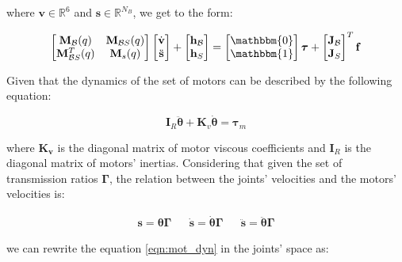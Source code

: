 where $\mathrm{\mathbf{v}} \in \mathbb{R} ^{6}$ and $\mathbf{s} \in \mathbb{R}^{N_B}$, we get to the form:

\begin{equation}
    \begin{bmatrix}
        \mathbf{M} _{\mathcal{B}}(q)     & \mathbf{M} _{\mathcal{B}S}(q) \\
        \mathbf{M} _{\mathcal{B}S} ^T(q) & \mathbf{M} _s(q)
    \end{bmatrix}
    \begin{bmatrix}
        \dot{\mathrm{\mathbf{v}}} \\
        \ddot{\mathbf{s}}
    \end{bmatrix}+
    \begin{bmatrix}
        \mathbf{h} _{\mathcal{B}} \\
        \mathbf{h} _S
    \end{bmatrix}=
    \begin{bmatrix}
        \mathbbm{0} \\
        \mathbbm{1}
    \end{bmatrix}
    \boldsymbol{\tau}
    +
    \begin{bmatrix}
        \mathbf{J} _{\mathcal{B}} \\
        \mathbf{J} _S
    \end{bmatrix} ^T
    \mathbf{f}
\end{equation}

Given that the dynamics of the set of motors can be described by the following equation:

\begin{equation}
    \mathbf{I} _R \ddot{\boldsymbol{\theta}} + \mathbf{K}_v \dot{\boldsymbol{\theta}} = \boldsymbol{\tau}_m
    \label{eqn:mot_dyn}
\end{equation}

where $\mathbf{K _v}$ is the diagonal matrix of motor viscous coefficients and $\mathbf{I}_R$ is the diagonal matrix of motors' inertias. Considering that given the set of transmission ratios $\boldsymbol{\Gamma}$, the relation between the joints' velocities and the motors' velocities is:

\begin{align}
    \mathbf{s} = \boldsymbol{\theta} \boldsymbol{\Gamma} &  & \dot{\mathbf{s}} = \dot{\boldsymbol{\theta}} \boldsymbol{\Gamma} &  & \ddot{\mathbf{s}} = \ddot{\boldsymbol{\theta}} \boldsymbol{\Gamma}
\end{align}

we can rewrite the equation \cref{eqn:mot_dyn} in the joints' space as:

